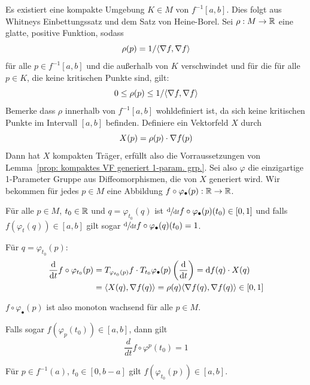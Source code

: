 \begin{bigproof}
    Es existiert eine kompakte Umgebung $K \in M$ von $f^{-1}[a, b]$. Dies folgt
    aus Whitneys Einbettungssatz und dem Satz von Heine-Borel.
    Sei $\rho: M \to { \mathbb R }$ eine glatte, positive Funktion, sodass
    \[ \rho(p) = 1 / \langle { \nabla } f, { \nabla } f \rangle \]
    für alle $p \in f^{-1}[a, b]$ und die außerhalb von $K$ verschwindet und für
    die für alle $p \in K$, die keine kritischen Punkte sind, gilt: 
    \[ 0 \leq \rho(p) \leq 1 / \langle { \nabla } f, { \nabla } f \rangle \]
    Bemerke dass $\rho$ innerhalb von $f^{-1}[a, b]$ wohldefiniert 
    ist, da sich keine kritischen Punkte im Intervall $[a, b]$ befinden. 
    Definiere ein Vektorfeld $X$ durch
    \[ X(p) = \rho(p) \cdot { \nabla } f (p) \]
    Dann hat $X$ kompakten Träger, erfüllt also die Vorraussetzungen von 
    Lemma~\ref{prop: kompaktes VF generiert 1-param. grp.}. Sei also $\varphi$ die
    einzigartige 1-Parameter Gruppe aus Diffeomorphismen, die von $X$ generiert
    wird. 
    Wir bekommen für jedes $p \in M$ eine Abbildung 
    $f \circ \varphi_{\bullet}(p): { \mathbb R } \to { \mathbb R }$.
    
    \begin{claim} 
        Für alle $p \in M$, $t_0 \in { \mathbb R }$ und $q = \varphi_{t_0}(q)$
        ist $\derive{t} f \circ \varphi_{\bullet}(p) (t_0) \in [0, 1]$ und falls $f(\varphi_t(q)) \in [a, b]$
        gilt sogar $\derive{t} f \circ \varphi_{\bullet}(q) (t_0) = 1$.
    \end{claim}

    \begin{smallproof}
        Für $q = \varphi_{t_0}(p)$:
        \begin{align*}
            \derive{t} f \circ \varphi_{t_0}(p)
            & = T_{\varphi_{t_0}(p)} f \cdot T_{t_0}\varphi_{\bullet}(p) \left( \derive{t} \right)
            = \opd f (q) \cdot X(q) \\
            & = \langle X(q), \grad f (q) \rangle 
            = \rho(q) \langle \grad f (q), \grad f (q) \rangle \in [0, 1]
        \end{align*}
        
        $f \circ \varphi_{\bullet}(p)$ ist also monoton wachsend für alle $p \in M$.

        Falls sogar $f(\varphi_p(t_0)) \in [a, b]$, dann gilt
        \[ \frac{d}{dt} f \circ \varphi^p (t_0) = 1 \]
    \end{smallproof}

    \begin{claim} 
        Für $p \in f^{-1}(a)$, $t_0 \in [0, b-a]$ gilt $f(\varphi_{t_0}(p)) \in [a, b]$.
    \end{claim}
    

\end{bigproof}

